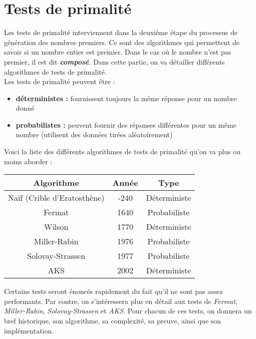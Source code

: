 \section{Tests de primalité}

	Les tests de primalité interviennent dans la deuxième étape du processus de génération des nombres premiers. Ce sont des algorithmes qui permettent de savoir si un nombre entier est premier. Dans le cas où le nombre n'est pas premier, il est dit \textbf{\textit{composé}}. Dans cette partie, on va détailler différents algorithmes de tests de primalité.\\
	Les tests de primalité peuvent être :
	\begin{itemize}[leftmargin=*]
		\item \textbf{déterministes :} fournissent toujours la même réponse pour un nombre donné
		\item \textbf{probabilistes :} peuvent fournir des réponses différentes pour un même nombre (utilisent des données tirées aléatoirement)
	\end{itemize}
	
	Voici la liste des différents algorithmes de tests de primalité qu'on va plus ou moins aborder :
	\begin{table}[H]\begin{center}
		\begin{tabular}{|c|c|c|}
		\hline
		Algorithme           & Année & Type       \\ \hline
		Naïf (Crible d’Eratosthène) & -240  & Déterministe \\ \hline
		Fermat               & 1640  & Probabiliste \\ \hline
		Wilson               & 1770  & Déterministe \\ \hline
		Miller-Rabin         & 1976  & Probabiliste \\ \hline
		Solovay-Strassen     & 1977  & Probabiliste \\ \hline
		AKS                  & 2002  & Déterministe \\ \hline
		\end{tabular}
	\end{center}\end{table}
	
	Certains tests seront énoncés rapidement du fait qu'il ne sont pas assez performants. Par contre, on s'intéressera plus en détail aux tests de \textit{Fermat}, \textit{Miller-Rabin}, \textit{Solovay-Strassen} et \textit{AKS}. Pour chacun de ces tests, on donnera un bref historique, son algorithme, sa complexité, sa preuve, ainsi que son implémentation.
	
	
	
	
	
	
	